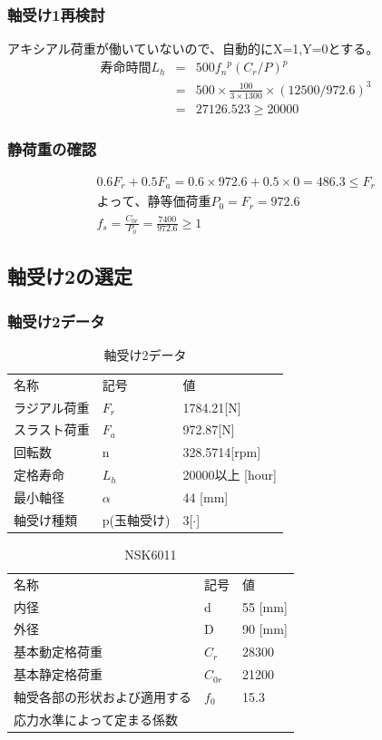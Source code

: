 \documentclass[a4j,twoside,openright,11pt]{jreport}
\begin{document}
\subsubsection{軸受け1再検討}
アキシアル荷重が働いていないので、自動的にX=1,Y=0とする。
\begin{eqnarray}
寿命時間L_h &=& 500{f_n}^p(C_r/P)^p\\
           &=& 500 \times \frac{100}{3 \times 1300} \times (12500/972.6)^3\\
           &=& 27126.523 \geq 20000
\end{eqnarray}

\subsubsection{静荷重の確認}
\begin{eqnarray}
0.6F_r+0.5F_a=0.6 \times 972.6 + 0.5 \times 0 = 486.3 \leq F_r\\
よって、静等価荷重P_0 = F_r=972.6\\
f_s = \frac{C_{0r}}{P_0} = \frac{7400}{972.6}\geq 1
\end{eqnarray}

\newpage
\subsection{軸受け2の選定}
\subsubsection{軸受け2データ}
\begin{table}[htb]
\begin{center}
  \caption{軸受け2データ}
  \begin{tabular}{lll} \hline
名称&記号&値\\
ラジアル荷重&$F_r$&1784.21[N]\\
スラスト荷重&$F_a$&972.87[N]\\
回転数&n&328.5714[rpm]\\
定格寿命&$L_h$&20000以上 [hour]\\
最小軸径&$\alpha$&44 [mm]\\
軸受け種類&p(玉軸受け)&3[$\cdot$]\\
\hline
  \end{tabular}
\end{center}
\end{table}

\begin{table}[htb]
\begin{center}
  \caption{NSK6011}
  \begin{tabular}{lll} \hline
名称&記号&値\\
内径& d &55 [mm]\\
外径& D &90 [mm]\\
基本動定格荷重&$C_{r}$&28300\\
基本静定格荷重&$C_{0r}$&21200\\
軸受各部の形状および適用する&$f_0$&15.3\\
応力水準によって定まる係数&&\\
\hline
  \end{tabular}
\end{center}
\end{table}
\end{document}
